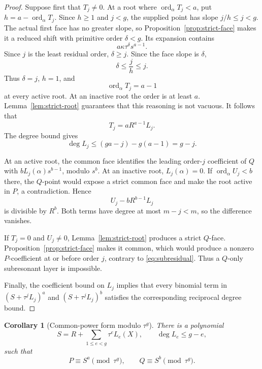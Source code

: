 \documentclass[11pt]{article}
\newtheorem{corollary}[theorem]{Corollary}
\theoremstyle{definition}
\theoremstyle{remark}
\newcommand{\ord}{\operatorname{ord}}
\begin{document}
\begin{proof}
Suppose first that \(T_j\neq0\).  At a root where
\(\ord_\alpha T_j<a\), put \(h=a-\ord_\alpha T_j\).
Since \(h\geq1\) and \(j<g\), the supplied point has slope
\(j/h\leq j<g\).
The actual first face has no greater slope, so
Proposition~\ref{prop:strict-face} makes it a reduced shift with
primitive order \(\delta<g\).  Its expansion contains
\[
 a\kappa\tau^\delta s^{a-1}.
\]
Since \(j\) is the least residual order, \(\delta\geq j\).  Since the
face slope is \(\delta\),
\[
 \delta\leq\frac{j}{h}\leq j.
\]
Thus \(\delta=j\), \(h=1\), and
\[
 \ord_\alpha T_j=a-1
\]
at every active root.  At an inactive root the order is at least
\(a\).  Lemma~\ref{lem:strict-root} guarantees that this reasoning is
not vacuous.  It follows that
\[
 T_j=aR^{a-1}L_j.
\]
The degree bound gives
\[
 \deg L_j
 \leq(ga-j)-g(a-1)=g-j.
\]

At an active root, the common face identifies the leading
order-\(j\) coefficient of \(Q\) with
\(bL_j(\alpha)s^{b-1}\), modulo \(s^b\).  At an inactive root,
\(L_j(\alpha)=0\).  If \(\ord_\alpha U_j<b\) there, the \(Q\)-point
would expose a strict common face and make the root active in \(P\),
a contradiction.  Hence
\[
 U_j-bR^{b-1}L_j
\]
is divisible by \(R^b\).  Both terms have degree at most \(m-j<m\),
so the difference vanishes.

If \(T_j=0\) and \(U_j\neq0\), Lemma~\ref{lem:strict-root} produces a
strict \(Q\)-face.  Proposition~\ref{prop:strict-face} makes it common,
which would produce a nonzero \(P\)-coefficient at or before order
\(j\), contrary to \eqref{eq:subresidual}.  Thus a \(Q\)-only
subresonant layer is impossible.

Finally, the coefficient bound on \(L_j\) implies that every binomial
term in \((S+\tau^jL_j)^a\) and
\((S+\tau^jL_j)^b\) satisfies the corresponding reciprocal degree
bound.
\end{proof}

\begin{corollary}[Common-power form modulo \(\tau^g\)]
\label{cor:modg}
There is a polynomial
\begin{equation}
 S=R+\sum_{1\leq e<g}\tau^eL_e(X),
 \qquad \deg L_e\leq g-e,
\label{eq:S}
\end{equation}
such that
\begin{equation}
 P\equiv S^a\pmod{\tau^g},\qquad
 Q\equiv S^b\pmod{\tau^g}.
\label{eq:modg}
\end{equation}
\end{corollary}
\end{document}
